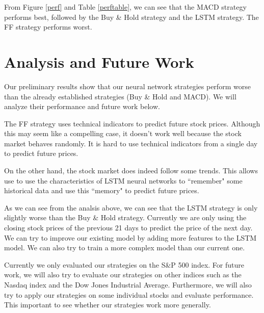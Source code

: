 \documentclass[10pt]{article}
\begin{document}
From Figure \ref{perf} and Table \ref{perftable}, we can see that the MACD strategy performs best, followed by the Buy \& Hold strategy and the LSTM strategy. The FF strategy performs worst.


\section{Analysis and Future Work}

Our preliminary results show that our neural network strategies perform worse than the already established strategies (Buy \& Hold and MACD). We will analyze their performance and future work below.

The FF strategy uses technical indicators to predict future stock prices. Although this may seem like a compelling case, it doesn't work well because the stock market behaves randomly. It is hard to use technical indicators from a single day to predict future prices.

On the other hand, the stock market does indeed follow some trends. This allows use to use the characteristics of LSTM neural networks to ``remember" some historical data and use this ``memory" to predict future prices.

As we can see from the analsis above, we can see that the LSTM strategy is only slightly worse than the Buy \& Hold strategy. Currently we are only using the closing stock prices of the previous 21 days to predict the price of the next day. We can try to improve our existing model by adding more features to the LSTM model. We can also try to train a more complex model than our current one.

Currently we only evaluated our strategies on the S\&P 500 index. For future work, we will also try to evaluate our strategies on other indices such as the Nasdaq index and the Dow Jones Industrial Average. Furthermore, we will also try to apply our strategies on some individual stocks and evaluate performance. This important to see whether our strategies work more generally.
\end{document}

